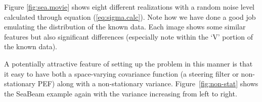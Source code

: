 
\par 
Figure \ref{fig:sea.movie} shows eight different realizations with a
random noise level calculated through equation (\ref{eq:sigma.calc}).
Note how we have done a good job emulating the
distribution of the known data. Each image shows some similar
features but also significant differences (especially note
within the `V' portion of the known data).
\par



A potentially attractive feature of setting up the problem in this
manner is that it easy to have both  a space-varying covariance function
(a steering filter or non-stationary PEF) along with a non-stationary
variance. Figure~\ref{fig:non-stat} shows the SeaBeam example
again with the variance increasing from left to right.

